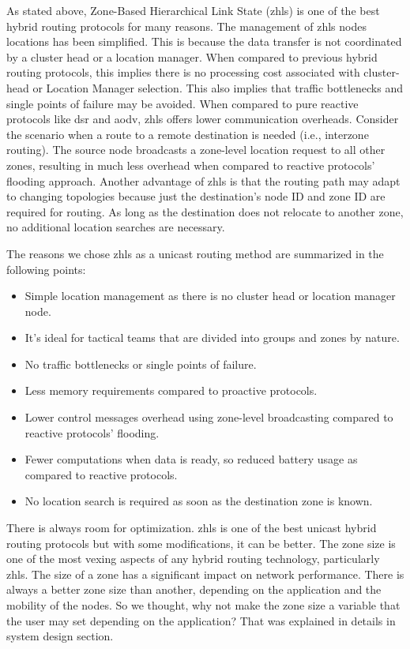 As stated above, Zone-Based Hierarchical Link State (\acrshort{zhls}) is one of the best hybrid routing protocols for many reasons. The management of \acrshort{zhls} nodes locations has been simplified. This is because the data transfer is not coordinated by a cluster head or a location manager. When compared to previous hybrid routing protocols, this implies there is no processing cost associated with cluster-head or Location Manager selection. This also implies that traffic bottlenecks and single points of failure may be avoided. When compared to pure reactive protocols like \acrshort{dsr} and \acrshort{aodv}, \acrshort{zhls} offers lower communication overheads. Consider the scenario when a route to a remote destination is needed (i.e., interzone routing). The source node broadcasts a zone-level location request to all other zones, resulting in much less overhead when compared to reactive protocols' flooding approach. Another advantage of \acrshort{zhls} is that the routing path may adapt to changing topologies because just the destination's node ID and zone ID are required for routing. As long as the destination does not relocate to another zone, no additional location searches are necessary.

The reasons we chose \acrshort{zhls} as a unicast routing method are summarized in the following points:

\begin{itemize}[itemsep=1pt, topsep=5pt]
    \item Simple location management as there is no cluster head or location manager node.
    \item It's ideal for tactical teams that are divided into groups and zones by nature.
    \item No traffic bottlenecks or single points of failure.
    \item Less memory requirements compared to proactive protocols.
    \item Lower control messages overhead using zone-level broadcasting compared to reactive protocols' flooding.
    \item Fewer computations when data is ready, so reduced battery usage as compared to reactive protocols.
    \item No location search is required as soon as the destination zone is known.
\end{itemize} 

There is always room for optimization. \acrshort{zhls} is one of the best unicast hybrid routing protocols but with some modifications, it can be better. The zone size is one of the most vexing aspects of any hybrid routing technology, particularly \acrshort{zhls}. The size of a zone has a significant impact on network performance. There is always a better zone size than another, depending on the application and the mobility of the nodes. So we thought, why not make the zone size a variable that the user may set depending on the application?
That was explained in details in system design section.


